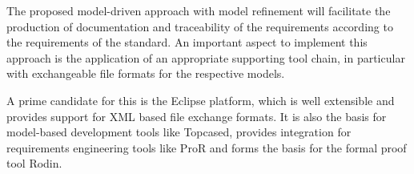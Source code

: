 The proposed model-driven approach with model refinement will facilitate the
production of documentation and traceability of the requirements according to
the requirements of the standard. An important aspect to implement this approach
is the application of an appropriate supporting tool chain, in particular with
exchangeable file formats for the respective models.

A prime candidate for this is the Eclipse platform, which is well extensible and
provides support for XML based file exchange formats. It is also the basis for
model-based development tools like Topcased, provides integration for
requirements engineering tools like ProR and forms the basis for the formal
proof tool Rodin.


